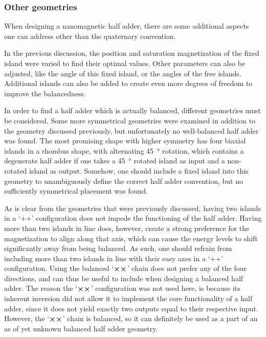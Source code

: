 \documentclass[11pt,a4paper,english,twoside]{article}
\begin{document}
\subsubsection{Other geometries}
When designing a nanomagnetic half adder, there are some additional aspects one can address other than the quaternary convention. \par
In the previous discussion, the position and saturation magnetization of the fixed island were varied to find their optimal values. Other parameters can also be adjusted, like the angle of this fixed island, or the angles of the free islands. Additional islands can also be added to create even more degrees of freedom to improve the balancedness. \par
In order to find a half adder which is actually balanced, different geometries must be considered. Some more symmetrical geometries were examined in addition to the geometry discussed previously, but unfortunately no well-balanced half adder was found. The most promising shape with higher symmetry has four biaxial islands in a rhombus shape, with alternating \SI{45}{\degree} rotation, which contains a degenerate half adder if one takes a \SI{45}{\degree} rotated island as input and a non-rotated island as output. Somehow, one should include a fixed island into this geometry to unambiguously define the correct half adder convention, but no sufficiently symmetrical placement was found. \par %
As is clear from the geometries that were previously discussed, having two islands in a `++' configuration does not impede the functioning of the half adder. Having more than two islands in line does, however, create a strong preference for the magnetization to align along that axis, which can cause the energy levels to shift significantly away from being balanced. As such, one should refrain from including more than two islands in line with their easy axes in a `++' configuration. Using the balanced `$\cross \cross$' chain does not prefer any of the four directions, and can thus be useful to include when designing a balanced half adder. The reason the `$\cross \cross$' configuration was not used here, is because its inherent inversion did not allow it to implement the core functionality of a half adder, since it does not yield exactly two outputs equal to their respective input. However, the `$\cross \cross$' chain is balanced, so it can definitely be used as a part of an as of yet unknown balanced half adder geometry. \par
\end{document}
